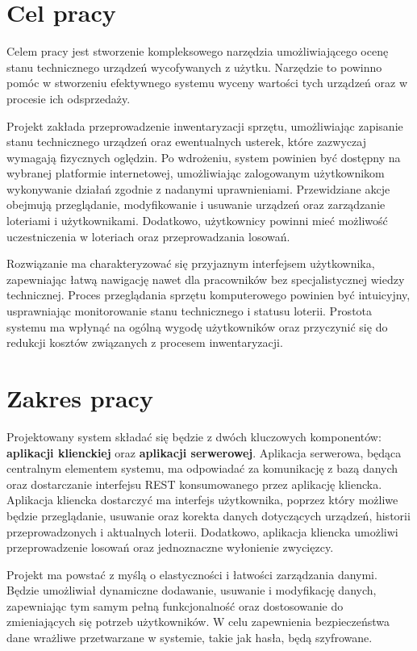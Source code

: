 \section{Cel pracy}
Celem  pracy jest stworzenie kompleksowego narzędzia umożliwiającego ocenę stanu technicznego urządzeń wycofywanych z użytku. Narzędzie to powinno pomóc w stworzeniu  efektywnego systemu wyceny wartości tych urządzeń oraz w procesie ich odsprzedaży.

Projekt zakłada przeprowadzenie inwentaryzacji sprzętu, umożliwiając zapisanie stanu technicznego urządzeń oraz ewentualnych usterek, które zazwyczaj wymagają fizycznych oględzin. Po wdrożeniu, system powinien być dostępny na wybranej platformie internetowej, umożliwiając zalogowanym użytkownikom wykonywanie działań zgodnie z nadanymi uprawnieniami. Przewidziane akcje obejmują przeglądanie, modyfikowanie i usuwanie urządzeń oraz zarządzanie loteriami i użytkownikami. Dodatkowo, użytkownicy powinni mieć możliwość uczestniczenia w loteriach oraz przeprowadzania losowań.

Rozwiązanie ma charakteryzować się przyjaznym interfejsem użytkownika, zapewniając łatwą nawigację nawet dla pracowników bez specjalistycznej wiedzy technicznej. Proces przeglądania sprzętu komputerowego powinien być intuicyjny, usprawniając monitorowanie stanu technicznego i statusu loterii. Prostota systemu ma wpłynąć na ogólną wygodę użytkowników oraz przyczynić się do redukcji kosztów związanych z procesem inwentaryzacji.

\section{Zakres pracy}
Projektowany system składać się będzie z dwóch kluczowych komponentów: \textbf{aplikacji klienckiej} oraz \textbf{aplikacji serwerowej}. 
Aplikacja serwerowa, będąca centralnym elementem systemu, ma odpowiadać za komunikację z bazą danych oraz dostarczanie interfejsu REST konsumowanego przez aplikację kliencka. 
Aplikacja kliencka dostarczyć ma interfejs użytkownika, poprzez który możliwe będzie przeglądanie, usuwanie oraz korekta danych dotyczących urządzeń, historii przeprowadzonych i aktualnych loterii. Dodatkowo, aplikacja kliencka umożliwi przeprowadzenie losowań oraz jednoznaczne wyłonienie zwycięzcy.

Projekt ma powstać z myślą o elastyczności i łatwości zarządzania danymi. Będzie umożliwiał dynamiczne dodawanie, usuwanie i modyfikację danych, zapewniając tym samym pełną funkcjonalność oraz dostosowanie do zmieniających się potrzeb użytkowników. W celu zapewnienia bezpieczeństwa dane wrażliwe przetwarzane w systemie, takie jak hasła, będą szyfrowane.


